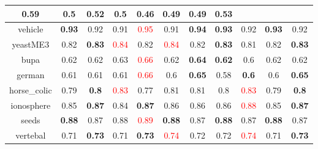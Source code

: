 \documentclass{article}%
\begin{document}
\begin{tabular}{c|cccccccccc}
{0.59
}&0.5&\textbf{0.52}&0.5&0.46&\textbf{0.49}&0.49&\textbf{0.53}\\%
\hline%
vehicle&\textbf{0.93}&0.92&0.91&\textcolor{red}{ 
0.95
}&0.91&\textbf{0.94}&\textbf{0.93}&0.92&\textbf{0.93}&0.92\\%
\hline%
yeastME3&0.82&\textbf{0.83}&\textcolor{red}{ 
0.84
}&0.82&\textcolor{red}{ 
0.84
}&0.82&\textbf{0.83}&0.81&0.82&\textbf{0.83}\\%
\hline%
bupa&0.62&0.62&0.63&\textcolor{red}{ 
0.66
}&0.62&\textbf{0.64}&\textbf{0.62}&0.6&0.62&0.62\\%
\hline%
german&0.61&0.61&0.61&\textcolor{red}{ 
0.66
}&0.6&\textbf{0.65}&0.58&\textbf{0.6}&0.6&\textbf{0.65}\\%
\hline%
horse\_colic&0.79&\textbf{0.8}&\textcolor{red}{ 
0.83
}&0.77&0.81&0.81&0.8&\textcolor{red}{ 
0.83
}&0.79&\textbf{0.8}\\%
\hline%
ionosphere&0.85&\textbf{0.87}&0.84&\textbf{0.87}&0.86&0.86&0.86&\textcolor{red}{ 
0.88
}&0.85&\textbf{0.87}\\%
\hline%
seeds&\textbf{0.88}&0.87&0.88&\textcolor{red}{ 
0.89
}&\textbf{0.88}&0.87&\textbf{0.88}&0.87&\textbf{0.88}&0.87\\%
\hline%
vertebal&0.71&\textbf{0.73}&0.71&\textbf{0.73}&\textcolor{red}{ 
0.74
}&0.72&0.72&\textcolor{red}{ 
0.74
}&0.71&\textbf{0.73}\\%
\hline%
\end{tabular}

%
\end{document}
